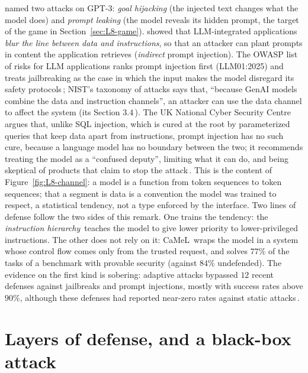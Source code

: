\begin{beyond}
\citet{perez2022} named two attacks on GPT-3: \emph{goal hijacking} (the injected text changes what the model does) and \emph{prompt leaking} (the model reveals its hidden prompt, the target of the game in Section~\ref{sec:L8-game}). \citet{greshake2023} showed that LLM-integrated applications \emph{blur the line between data and instructions}, so that an attacker can plant prompts in content the application retrieves (\emph{indirect} prompt injection). The OWASP list of risks for LLM applications ranks prompt injection first (LLM01:2025) and treats jailbreaking as the case in which the input makes the model disregard its safety protocols\,\citep{owasp2025}; NIST's taxonomy of attacks says that, ``because GenAI models combine the data and instruction channels'', an attacker can use the data channel to affect the system (its Section 3.4\,\citep{vassilev2025}). The UK National Cyber Security Centre argues that, unlike SQL injection, which is cured at the root by parameterized queries that keep data apart from instructions, prompt injection has no such cure, because a language model has no boundary between the two; it recommends treating the model as a ``confused deputy'', limiting what it can do, and being skeptical of products that claim to stop the attack\,\citep{chismon2025}. This is the content of Figure~\ref{fig:L8-channel}: a model is a function from token sequences to token sequences; that a segment is data is a convention the model was trained to respect, a statistical tendency, not a type enforced by the interface. Two lines of defense follow the two sides of this remark. One trains the tendency: the \emph{instruction hierarchy}\,\citep{wallace2024} teaches the model to give lower priority to lower-privileged instructions. The other does not rely on it: CaMeL\,\citep{debenedetti2025} wraps the model in a system whose control flow comes only from the trusted request, and solves $77\%$ of the tasks of a benchmark with provable security (against $84\%$ undefended). The evidence on the first kind is sobering: adaptive attacks bypassed $12$ recent defenses against jailbreaks and prompt injections, mostly with success rates above $90\%$, although these defenses had reported near-zero rates against static attacks\,\citep{nasr2025}.
\end{beyond}

\section{Layers of defense, and a black-box attack}\label{sec:L8-layers}

